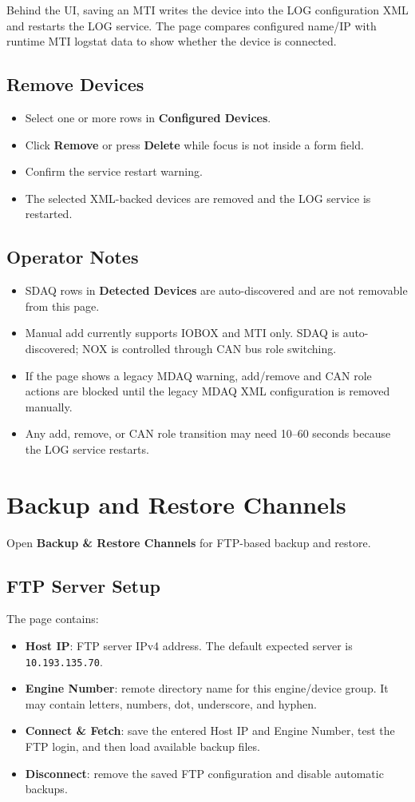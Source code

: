 \documentclass[11pt,a4paper]{article}
\begin{document}
Behind the UI, saving an MTI writes the device into the LOG configuration XML and restarts the LOG service. The page compares configured name/IP with runtime MTI logstat data to show whether the device is connected.

\subsection{Remove Devices}
\begin{itemize}
\item Select one or more rows in \textbf{Configured Devices}.
\item Click \textbf{Remove} or press \textbf{Delete} while focus is not inside a form field.
\item Confirm the service restart warning.
\item The selected XML-backed devices are removed and the LOG service is restarted.
\end{itemize}

\subsection{Operator Notes}
\begin{itemize}
\item SDAQ rows in \textbf{Detected Devices} are auto-discovered and are not removable from this page.
\item Manual add currently supports IOBOX and MTI only. SDAQ is auto-discovered; NOX is controlled through CAN bus role switching.
\item If the page shows a legacy MDAQ warning, add/remove and CAN role actions are blocked until the legacy MDAQ XML configuration is removed manually.
\item Any add, remove, or CAN role transition may need 10--60 seconds because the LOG service restarts.
\end{itemize}

\section{Backup and Restore Channels}
Open \textbf{Backup \& Restore Channels} for FTP-based backup and restore.

\subsection{FTP Server Setup}
The page contains:

\begin{itemize}
\item \textbf{Host IP}: FTP server IPv4 address. The default expected server is \texttt{10.193.135.70}.
\item \textbf{Engine Number}: remote directory name for this engine/device group. It may contain letters, numbers, dot, underscore, and hyphen.
\item \textbf{Connect \& Fetch}: save the entered Host IP and Engine Number, test the FTP login, and then load available backup files.
\item \textbf{Disconnect}: remove the saved FTP configuration and disable automatic backups.
\end{itemize}
\end{document}
